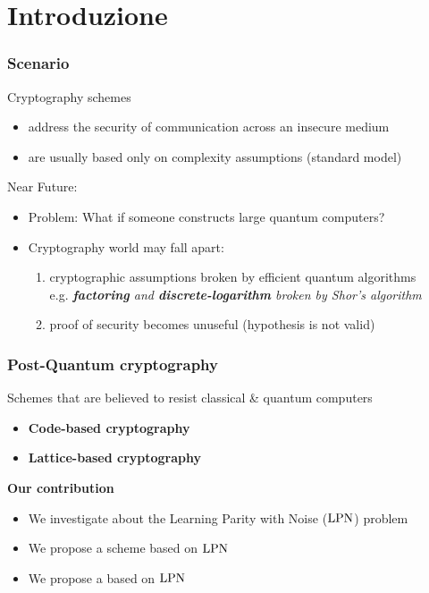 \section{Introduzione}

\begin{frame}
 \frametitle{Scenario}
 
 \begin{block}{Cryptography schemes}
 \begin{itemize}
  \item address the security of communication across an insecure medium
  \item are usually based only on complexity assumptions (standard model)
 \end{itemize}
 \end{block}
 \begin{block}{Near Future:}
 \begin{itemize}
    \item \alert{Problem:} What if someone constructs large quantum computers?
    \item Cryptography world may fall apart:
    \begin{enumerate}
     \item<4-> cryptographic assumptions broken by efficient quantum algorithms \\
	  e.g. \emph{\textbf{factoring} and \textbf{discrete-logarithm} broken by Shor's algorithm}
     \item<5-> proof of security becomes unuseful (hypothesis is not valid)
    \end{enumerate}
 \end{itemize}
\end{block}

\end{frame}

\begin{frame}
\frametitle{Post-Quantum cryptography}
 Schemes that are believed to resist classical \& quantum computers
      \begin{itemize}
      \item \textbf{Code-based cryptography}
      \item \alert<2->{\textbf{Lattice-based cryptography}}
      \end{itemize}
\vspace{10pt}
 \begin{block}{\textbf{Our contribution}}
 \begin{itemize}
  \item<2-> We investigate about the \alert{Learning Parity with Noise} ($\mathrm{LPN}$) problem
  \item<3-> We propose a {\color{blue}{Threshold Public-Key Encryption}} scheme based on $\mathrm{LPN}$
  \item<4-> We propose a {\color{blue}{Commitment protocol}} based on $\mathrm{LPN}$
 \end{itemize}

\end{block}

\end{frame}


